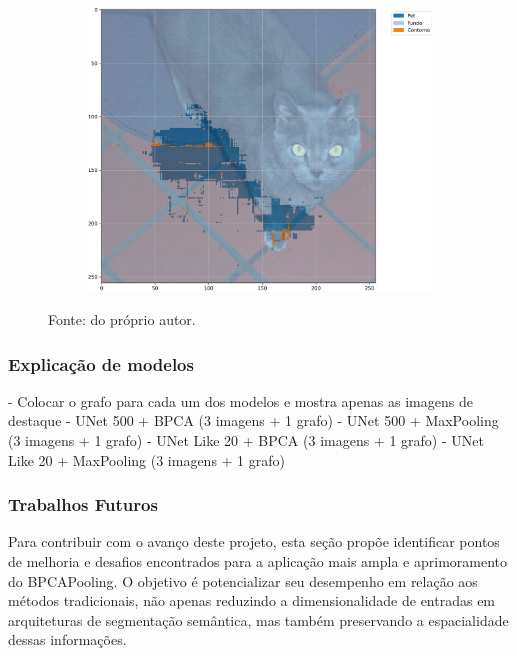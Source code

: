 \begin{figure}[H]
\begin{subfigure}[t]{0.32\textwidth}
         \label{results:fig:semantic:14.2}
     \end{subfigure}%
     ~ 
    \begin{subfigure}[t]{0.32\textwidth}
         \centering
         \includegraphics[width=1\linewidth]{recursos/imagens/results/bpca_miou_unetlie500_image_2_overlayed_segmentation.png}
         \label{results:fig:semantic:14.3}
     \end{subfigure}%

    Fonte: do próprio autor.
\end{figure}



\subsubsection{Explicação de modelos}
\label{results:semantic:xai}
- Colocar o grafo para cada um dos modelos e mostra apenas as imagens de destaque
    - UNet 500 + BPCA (3 imagens + 1 grafo)
    - UNet 500 + MaxPooling (3 imagens + 1 grafo)
    - UNet Like 20 + BPCA (3 imagens + 1 grafo)
    - UNet Like 20 + MaxPooling (3 imagens + 1 grafo)

\subsubsection{Trabalhos Futuros}
\label{results:semantic:future}
Para contribuir com o avanço deste projeto, esta seção propõe identificar pontos de melhoria e desafios encontrados para a aplicação mais ampla e aprimoramento do BPCAPooling. O objetivo é potencializar seu desempenho em relação aos métodos tradicionais, não apenas reduzindo a dimensionalidade de entradas em arquiteturas de segmentação semântica, mas também preservando a espacialidade dessas informações.

